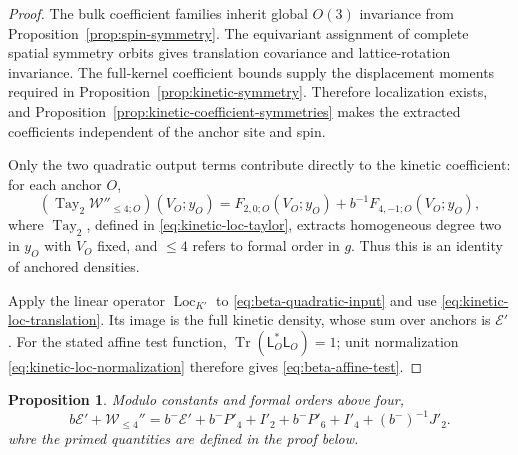 \documentclass[11pt]{article}
\newcommand{\tr}{\operatorname{Tr}}
\newcommand{\Tay}{\operatorname{Tay}}
\newcommand{\Loc}{\operatorname{Loc}}
\numberwithin{equation}{section}
\newtheorem{proposition}[theorem]{Proposition}
\theoremstyle{definition}
\theoremstyle{plain}
\begin{document}
\begin{proof}
The bulk coefficient families inherit global $O(3)$ invariance
from Proposition~\ref{prop:spin-symmetry}.  The equivariant
assignment of complete spatial symmetry orbits gives translation
covariance and lattice-rotation invariance.  The full-kernel
coefficient bounds supply the displacement moments required in
Proposition~\ref{prop:kinetic-symmetry}.  Therefore localization
exists, and Proposition~\ref{prop:kinetic-coefficient-symmetries}
makes the extracted coefficients independent of the anchor
site and spin.

Only the two quadratic output terms contribute directly to the
kinetic coefficient: for each anchor $O$,
\begin{equation}
 (\Tay_2\mathcal W''_{\le4;O})(V_O;y_O)
   =F_{2,0;O}(V_O;y_O)+b^{-1}F_{4,-1;O}(V_O;y_O),
 \label{eq:beta-quadratic-input}
\end{equation}
where $\Tay_2$, defined in
\eqref{eq:kinetic-loc-taylor}, extracts homogeneous degree two
in $y_O$ with $V_O$ fixed, and $\le4$ refers to formal order
in $g$.  Thus this is an identity of anchored densities.

Apply the linear operator $\Loc_{K'}$ to
\eqref{eq:beta-quadratic-input} and use
\eqref{eq:kinetic-loc-translation}.  Its image is the full
kinetic density, whose sum over anchors is $\mathcal E'$.
For the stated affine test function,
$\tr(\mathsf L_O^*\mathsf L_O)=1$; unit normalization
\eqref{eq:kinetic-loc-normalization} therefore gives
\eqref{eq:beta-affine-test}.
\end{proof}

\begin{proposition}
  Modulo constants and formal orders above four,
  \begin{equation}
  b\mathcal E'+\mathcal W_{\le4}''
  =b^-\mathcal E'+b^-P'_4+I'_2+b^-P'_6+I'_4+(b^-)^{-1}J'_2.
  \end{equation}
  whre the primed quantities are defined in the proof below.
\end{proposition}
\end{document}
